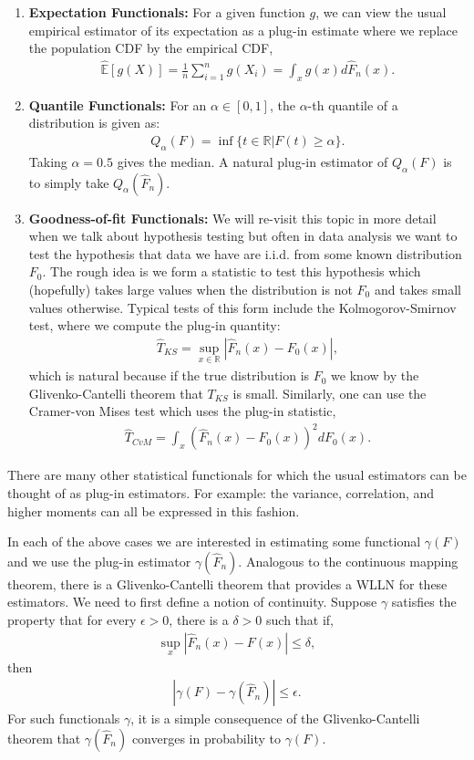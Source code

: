 \documentclass[twoside,12pt]{article}
\begin{document}
\begin{enumerate}
\item {\bf Expectation Functionals: } For a given function $g$, we can view the usual empirical estimator of its expectation as a plug-in estimate where we replace the population CDF by the empirical CDF, 
\begin{align*}
\widehat{\mathbb{E}}[g(X)] = \frac{1}{n} \sum_{i=1}^n g(X_i) = \int_x g(x) d \widehat{F}_n(x).
\end{align*} 
\item {\bf Quantile Functionals: } For an $\alpha \in [0,1]$, the $\alpha$-th quantile of a distribution is given as:
\begin{align*}
Q_{\alpha}(F) = \inf \{ t \in \mathbb{R} | F(t) \geq \alpha \}.
\end{align*}
Taking $\alpha = 0.5$ gives the median. A natural plug-in estimator of $Q_{\alpha}(F)$ is to simply take $Q_{\alpha}(\widehat{F}_n).$
\item {\bf Goodness-of-fit Functionals: } We will re-visit this topic in more detail when we talk about hypothesis testing but often in data analysis we want to test the hypothesis that data we have are i.i.d. from some known distribution $F_0$. The rough idea is we form a statistic to test this hypothesis which (hopefully) takes large values when the distribution is not $F_0$ and takes small values otherwise.
Typical tests of this form include the Kolmogorov-Smirnov test, where we compute the plug-in quantity:
\begin{align*}
\widehat{T}_{KS} = \sup_{x \in \mathbb{R}} | \widehat{F}_n(x) - F_0(x) |,
\end{align*} 
which is natural because if the true distribution is $F_0$ we know by the Glivenko-Cantelli theorem that $T_{KS}$ is small. Similarly, one can use the Cramer-von Mises test which uses the plug-in statistic,
\begin{align*}
\widehat{T}_{CvM} = \int_x  ( \widehat{F}_n(x) - F_0(x))^2 dF_0(x).
\end{align*}
\end{enumerate}

There are many other statistical functionals for which the usual estimators can be thought of as plug-in estimators. For example: the variance, correlation, and higher moments can all be expressed in this fashion. 

In each of the above cases we are interested in estimating some functional $\gamma(F)$ and we use the plug-in estimator $\gamma(\widehat{F}_n)$.
Analogous to the continuous mapping theorem, there is a Glivenko-Cantelli theorem that provides a WLLN for these estimators. We need to first define a notion of continuity. Suppose $\gamma$ satisfies the property that for every $\epsilon > 0$, there is a $\delta > 0$ such that if,
\begin{align*}
\sup_{x} |\widehat{F}_n(x) - F(x)| \leq \delta,
\end{align*}
then 
\begin{align*}
|\gamma(F) - \gamma(\widehat{F}_n) |\leq \epsilon. 
\end{align*}
For such functionals $\gamma$, it is a simple consequence of the Glivenko-Cantelli theorem that $\gamma(\widehat{F}_n)$ converges in probability to $\gamma(F)$.
\end{document}
